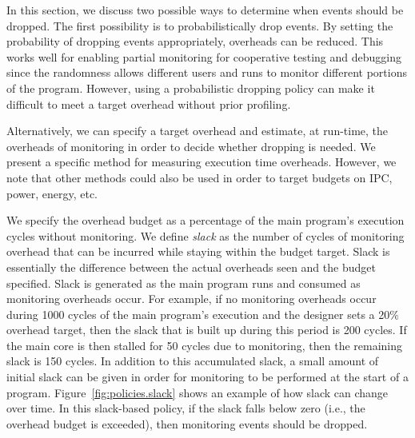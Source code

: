 In this section, we discuss two possible ways to determine when events should be dropped.
The first possibility is to probabilistically drop events. By setting the probability of
dropping events appropriately, overheads can be reduced. This works well for
enabling partial monitoring for cooperative testing and debugging since the
randomness allows different users and runs to monitor different portions of the
program. However, using a probabilistic dropping policy can make it difficult
to meet a target overhead without prior profiling.

Alternatively, we can specify a target overhead and estimate, at run-time, the
overheads of monitoring in order to decide whether dropping is needed.
We present a specific method
for measuring execution time overheads. However, we note that other methods
could also be used in order to target budgets on IPC, power, energy, etc.  

We specify the overhead budget as a percentage of the main program's execution
cycles without monitoring. We define \emph{slack} as the number of cycles of
monitoring overhead that can be incurred while staying within the budget
target. Slack is essentially the difference between the actual overheads seen
and the budget specified. Slack is generated as the main program runs and consumed as monitoring overheads occur.  For
example, if no monitoring overheads occur during 1000 cycles of the main
program's execution and the designer sets a 20\% overhead target, then the
slack that is built up during this period is 200 cycles. If the main core is
then stalled for 50 cycles due to monitoring, then the remaining slack is 150
cycles. 
In addition to this accumulated slack, a small amount of initial slack
can be given in order for monitoring to be performed at the start of a program.
Figure~\ref{fig:policies.slack} shows an example of how slack can change over time.
In this slack-based policy, if the slack falls below zero (i.e., the overhead budget is exceeded), then
monitoring events should be dropped.

